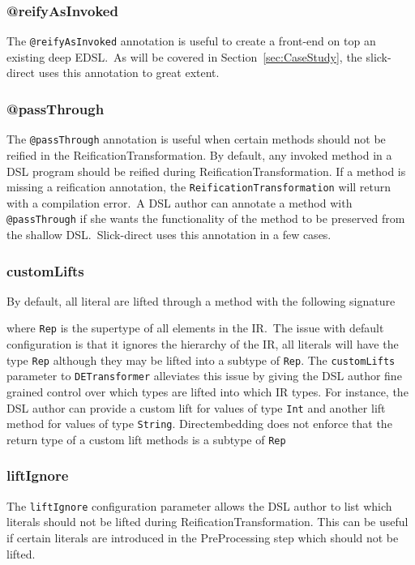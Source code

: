 \subsubsection{@reifyAsInvoked} %
\label{sub:reifyAsInvoked}
The \texttt{@reifyAsInvoked} annotation is useful to create a front-end on top an existing deep EDSL.\
As will be covered in Section~\ref{sec:CaseStudy}, the slick-direct uses this annotation to great extent.

\subsubsection{@passThrough} %
\label{sub:passThrough}
The \texttt{@passThrough} annotation is useful when certain methods should not be reified in the ReificationTransformation.
By default, any invoked method in a DSL program should be reified during ReificationTransformation.
If a method is missing a reification annotation, the \texttt{ReificationTransformation} will return with a compilation error.\
A DSL author can annotate a method with \texttt{@passThrough} if she wants the functionality of the method to be preserved from the shallow DSL.\
Slick-direct uses this annotation in a few cases.

\subsubsection{customLifts} %
\label{sub:customLifts}
By default, all literal are lifted through a method with the following signature

where \texttt{Rep} is the supertype of all elements in the IR.\
The issue with default configuration is that it ignores the hierarchy of the IR, all literals will have the type \texttt{Rep} although they may be lifted into a subtype of \texttt{Rep}.
The \texttt{customLifts} parameter to \texttt{DETransformer} alleviates this issue by giving the DSL author fine grained control over which types are lifted into which IR types.
For instance, the DSL author can provide a custom lift for values of type \texttt{Int} and another lift method for values of type \texttt{String}.
Directembedding does not enforce that the return type of a custom lift methods is a subtype of \texttt{Rep}

\subsubsection{liftIgnore} %
\label{sub:liftIgnore}
The \texttt{liftIgnore} configuration parameter allows the DSL author to list which literals should not be lifted during ReificationTransformation.
This can be useful if certain literals are introduced in the PreProcessing step which should not be lifted.



